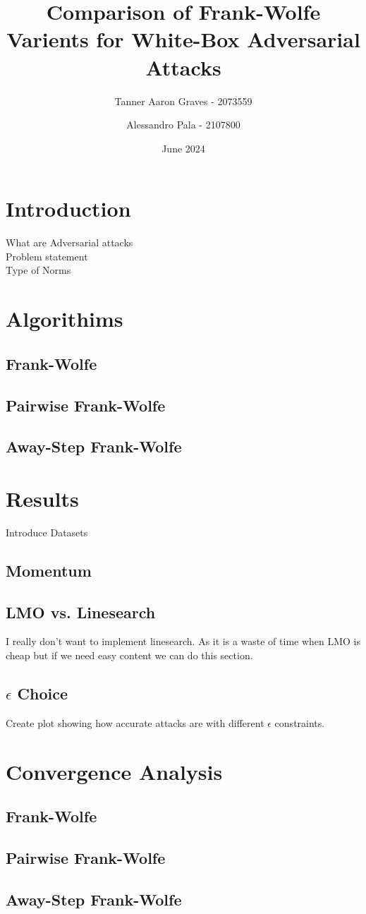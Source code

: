 \documentclass{article}
\title{Comparison of Frank-Wolfe Varients for White-Box Adversarial Attacks}
\author{Tanner Aaron Graves - 2073559\and Alessandro Pala - 2107800}
\date{June 2024}
\begin{document}
\maketitle

\section{Introduction}
What are Adversarial attacks\\
Problem statement\\
Type of Norms

\section{Algorithims}
\subsection{Frank-Wolfe}

\subsection{Pairwise Frank-Wolfe}
\subsection{Away-Step Frank-Wolfe}
\section{Results}
Introduce Datasets
\subsection{Momentum}
\subsection{LMO vs. Linesearch}
I really don't want to implement linesearch. As it is a waste of time when LMO is cheap but if we need easy content we can do this section.
\subsection{$\epsilon$ Choice}
Create plot showing how accurate attacks are with different $\epsilon$ constraints.
\section{Convergence Analysis}
\subsection{Frank-Wolfe}
\subsection{Pairwise Frank-Wolfe}
\subsection{Away-Step Frank-Wolfe}
\end{document}
